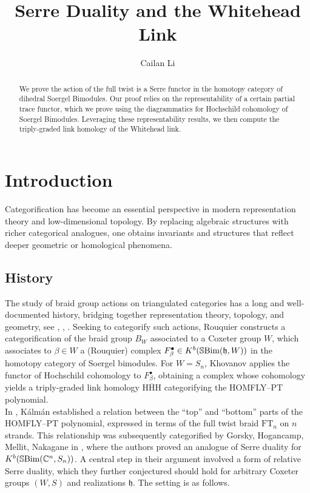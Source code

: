 \documentclass[10pt]{article}
\title{\textbf{Serre Duality and the Whitehead Link}}
\date{\relax }
\author{Cailan Li}
\numberwithin{theorem}{section}
\theoremstyle{definition}
\newcommand{\hf}{\mathfrak{h}}
\newcommand{\Cb}{\mathbb{C}}
\newcommand{\sbim}{\mathbb{S}\textnormal{Bim}}
\newcommand{\ft}{\mathrm{FT}}
\newcommand{\hhh}{\mathrm{HHH}}
\newcommand{\0}{\ \raisebox{-2ex}{\begin{tikzpicture}[xscale=0.25,yscale=0.3,thick,baseline]
 \draw (0,0) -- (0,3); 
\end{tikzpicture}}}
\renewcommand{\1}{\ \raisebox{-2ex}{\begin{tikzpicture}[xscale=0.25,yscale=0.3,thick,baseline]
 \draw (0,0) -- (0,1);
 \draw (0,2) -- (0,3);
 \node[dot] at (0,1) {};
  \node[dot] at (0,2) {};
\end{tikzpicture}}}
\begin{document}
\maketitle
\begin{abstract}
   We prove the action of the full twist  is a Serre functor in the homotopy category of dihedral Soergel Bimodules. Our proof relies on the representability of a certain partial trace functor, which we prove using the diagrammatics for Hochschild cohomology of Soergel Bimodules. Leveraging these representability results, we then compute the triply-graded link homology of the Whitehead link. 
\end{abstract}


\tableofcontents




\section{Introduction}

Categorification has become an essential perspective in modern representation theory and low-dimensional topology. By replacing algebraic structures with richer categorical analogues, one obtains invariants and structures that reflect deeper geometric or homological phenomena. 

\subsection{History}
The study of braid group actions on triangulated categories has a long and well-documented history, bridging together representation theory, topology, and geometry, see \cite{ST01}, \cite{KS02}, \cite{RZ03}. Seeking to categorify such actions, Rouquier \cite{Rou04} constructs a categorification of the braid group $B_W$ associated to a Coxeter group $W$, which associates to $\beta\in W$ a (Rouquier) complex $F^\bullet_\beta\in K^b(\sbim(\hf, W))$ in the homotopy category of Soergel bimodules. For $W=S_n$, Khovanov \cite{Kho07} applies the functor of Hochschild cohomology to $F^\bullet_\beta$, obtaining a complex whose cohomology yields a triply-graded link homology $\overline{\hhh}$ categorifying the HOMFLY–PT polynomial. \\


In \cite{Kal09}, Kálmán established a relation between the “top” and “bottom” parts of the HOMFLY–PT polynomial, expressed in terms of the full twist braid $\ft_n$ on $n$ strands. This relationship was subsequently categorified by Gorsky, Hogancamp, Mellit, Nakagane in \cite{GHMN19}, where the authors proved an analogue of Serre duality for $ K^b(\sbim(\Cb^n, S_n))$. A central step in their argument involved a form of relative Serre duality, which they further conjectured should hold for arbitrary Coxeter groups $(W, S)$ and realizations $\hf$. The setting is as follows.
\end{document}
